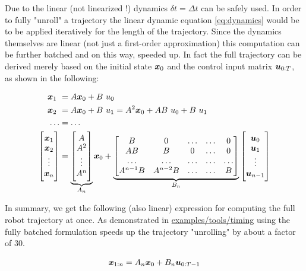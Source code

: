 Due to the linear (not linearized !) dynamics $\delta t = \Delta t$ can be safely used. In order to fully "unroll" a trajectory the linear dynamic equation \ref{eq:dynamics} would be to be applied iteratively for the length of the trajectory. Since the dynamics themselves are linear (not just a first-order approximation) this computation can be further batched and on this way, speeded up. In fact the full trajectory can be derived merely based on the initial state $\boldsymbol{x}_0$ and the control input matrix $\boldsymbol{u}_{0:T}$, as shown in the following:

\begin{align}
\x_1 &= A \x_0 + B \ u_0 \\
\x_2 &= A \x_0 + B \ u_1 = A^2 \x_0 + A B \ u_0 + B \ u_1\\ 
\hdots &= \hdots \\
\begin{bmatrix} \x_1 \\ \x_2 \\ \vdots \\ \x_n \end{bmatrix} &= \underbrace{\begin{bmatrix} A \\ A^2 \\ \vdots \\ A^n \end{bmatrix}}_{\substack{A_n}} \x_0 + \underbrace{\begin{bmatrix} B & 0 & \hdots & \hdots & 0 \\ AB & B & 0 & \hdots & 0 \\ \hdots & \hdots & \hdots & \hdots & \hdots \\ A^{n-1} B & A^{n-2} B & \hdots & \hdots & B \end{bmatrix}}_{\substack{B_n}} \begin{bmatrix} \u_0 \\ \u_1 \\ \vdots \\ \u_{n-1} \end{bmatrix}
\end{align}

In summary, we get the following (also linear) expression for computing the full robot trajectory at once. As demonstrated in \href{https://github.com/simon-schaefer/mantrap/blob/master/examples/tools/timing.ipynb}{examples/tools/timing} using the fully batched formulation speeds up the trajectory "unrolling" by about a factor of 30.  

\begin{equation}
\boldsymbol{x}_{1:n} = A_n \boldsymbol{x}_0 + B_n \boldsymbol{u}_{0:T-1}
\label{eq:dynamics_stacked}
\end{equation}

